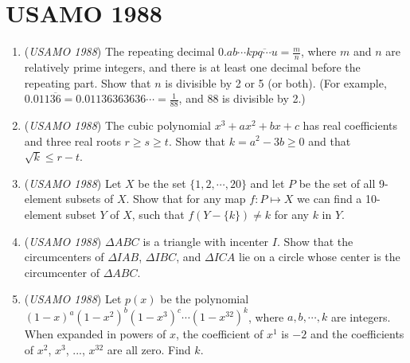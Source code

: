\section{USAMO 1988}
        \begin{enumerate}
        	\item (\textit{USAMO 1988}) The repeating decimal $0.ab\cdots k\overline{pq\cdots u}=\frac mn$, where $m$ and $n$ are relatively prime integers, and there is at least one decimal before the repeating part. Show that $n$ is divisible by 2 or 5 (or both). (For example, $0.011\overline{36}=0.01136363636\cdots=\frac 1{88}$, and 88 is divisible by 2.)


 

	\item (\textit{USAMO 1988}) The cubic polynomial $x^3+ax^2+bx+c$ has real coefficients and three real roots $r\ge s\ge t$. Show that $k=a^2-3b\ge 0$ and that $\sqrt k\le r-t$.


 

	\item (\textit{USAMO 1988}) Let $X$ be the set $\{ 1, 2, \cdots , 20\}$ and let $P$ be the set of all 9-element subsets of $X$. Show that for any map $f: P\mapsto X$ we can find a 10-element subset $Y$ of $X$, such that $f(Y-\{k\})\neq k$ for any $k$ in $Y$.


 

	\item (\textit{USAMO 1988}) $\Delta ABC$ is a triangle with incenter $I$. Show that the circumcenters of $\Delta IAB$, $\Delta IBC$, and $\Delta ICA$ lie on a circle whose center is the circumcenter of $\Delta ABC$.


 

	\item (\textit{USAMO 1988}) Let $p(x)$ be the polynomial $(1-x)^a(1-x^2)^b(1-x^3)^c\cdots(1-x^{32})^k$, where $a, b, \cdots, k$ are integers. When expanded in powers of $x$, the coefficient of $x^1$ is $-2$ and the coefficients of $x^2$, $x^3$, ..., $x^{32}$ are all zero. Find $k$.


 

\end{enumerate}